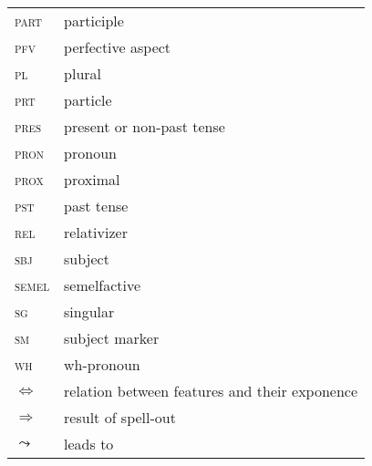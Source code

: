 \begin{multicols}{2}
\begin{tabular}{lp{4.5cm}}
\textsc{part}		&	participle\\
\textsc{pfv}		&	perfective aspect\\
\textsc{pl}			&	plural\\
\textsc{prt}		&	particle\\
\textsc{pres}		&	present or non-past tense\\
\textsc{pron}		&	pronoun\\
\textsc{prox}		&	proximal\\
\textsc{pst}		&	past tense\\
\textsc{rel}		&	relativizer\\
\textsc{sbj}		&	subject\\
\textsc{semel}		&	semelfactive\\
\textsc{sg}		&	singular\\
\textsc{sm}		&	subject marker\\
\textsc{wh}		&	wh-pronoun\\
$\Leftrightarrow$	&	relation between features and their exponence\\
$\Rightarrow$        	&    	result of spell-out \\
$\leadsto$        	&    	leads to \\
\end{tabular}

 
\end{multicols} 